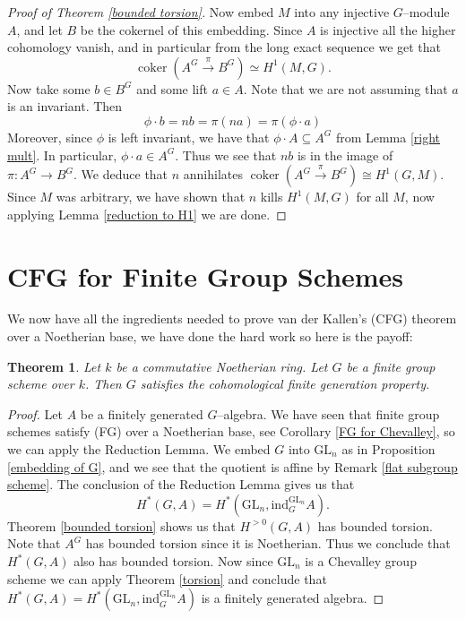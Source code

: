 \documentclass{article}
\theoremstyle{plain}
\newtheorem{Th}{Theorem}[section]
\theoremstyle{definition}
\DeclareMathOperator{\coker}{coker}
\newcommand{\GL}{\mathrm{GL}}
\begin{document}
\begin{proof}[Proof of Theorem \ref{bounded torsion}]
    Now embed $M$ into any injective $G$--module $A$, and let $B$ be the cokernel of this embedding. Since $A$ is injective all the higher cohomology vanish, and in particular from the long exact sequence we get that 
    \[
    \coker(A^G\xrightarrow{\pi}{} B^G) \simeq H^1(M, G).
    \]
    Now take some $b\in B^G$ and some lift $a\in A$. Note that we are not assuming that $a$ is an invariant.  Then 
    \[\phi \cdot b =nb =\pi(na)=\pi(\phi\cdot a)\]
    Moreover, since $\phi$ is left invariant, we have that $\phi \cdot A \subseteq A^G$ from Lemma \ref{right mult}. In particular, $\phi \cdot a\in A^G$.  Thus we see that $nb$  is in the image of $\pi\colon A^G\to B^G$. We deduce that $n$ annihilates 
    $\coker(A^G\xrightarrow{\pi}{} B^G)\cong H^1(G,M). $
    Since $M$ was arbitrary, we have shown that $n$ kills $H^1(M, G)$ for all $M$, now applying Lemma \ref{reduction to H1} we are done.
\end{proof}




\pagebreak



\section{CFG for Finite Group Schemes}






We now have all the ingredients needed to prove van der Kallen's (CFG) theorem over a Noetherian base, we have done the hard work so here is the payoff:

\begin{Th}
    Let $k$ be a commutative Noetherian ring. Let $G$ be a finite group scheme over $k$. Then $G$ satisfies the cohomological finite generation property. 
\end{Th}

\begin{proof}
    Let $A$ be a finitely generated $G$--algebra.  We have seen that finite group schemes satisfy (FG) over a Noetherian base, see Corollary \ref{FG for Chevalley}, so we can apply the Reduction Lemma. We embed $G$ into $\GL_n$ as in Proposition  \ref{embedding of G}, and we see that the quotient is affine by Remark \ref{flat subgroup scheme}. The conclusion of the Reduction Lemma gives us that 
    \[
    H^*(G, A)=H^\ast(\text{GL}_n,\mathrm{ind}_G^{\text{GL}_n} A).
    \]
    Theorem \ref{bounded torsion} shows us that $H^{>0}(G, A)$ has bounded torsion. Note that $A^G$ has bounded torsion since it is Noetherian. Thus we conclude that $H^*(G, A)$ also has bounded torsion. Now since $\GL_n$ is a Chevalley group scheme we can apply Theorem \ref{torsion} and conclude that $H^*(G, A)=H^\ast(\text{GL}_n,\mathrm{ind}_G^{\text{GL}_n} A)$ is a finitely generated algebra.
\end{proof}
\end{document}
